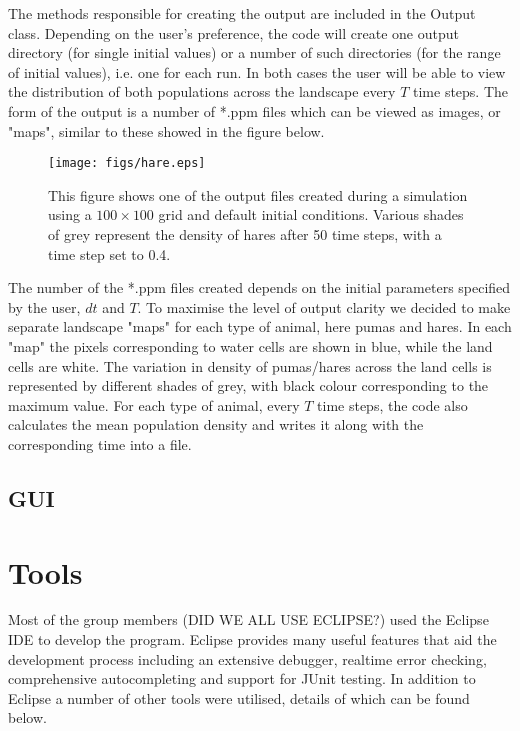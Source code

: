 \documentclass[11pt]{report}
\begin{document}
      The methods responsible for creating the output are included in the Output class. Depending on the user's preference, the code will create one output directory (for single initial values) or a number of such directories (for the range of initial values), i.e. one for each run. In both cases the user will be able to view the distribution of both populations across the landscape every $T$ time steps. The form of the output is a number of *.ppm files which can be viewed as images, or "maps", similar to these showed in the figure below.
      
      \begin{figure}[H]
      \begin{center}
      \texttt{[image: figs/hare.eps]}
      \caption{This figure shows one of the output files created during a simulation using a $100 \times 100$ grid and default initial conditions. Various shades of grey represent the density of hares after 50 time steps, with a time step set to 0.4.}
      \end{center}
      \end{figure}
      
      The number of the *.ppm files created depends on the initial parameters specified by the user, $dt$ and $T$. To maximise the level of output clarity we decided to make separate landscape "maps" for each type of animal, here pumas and hares. In each "map" the pixels corresponding to water cells are shown in blue, while the land cells are white. The variation in density of pumas/hares across the land cells is represented by different shades of grey, with black colour corresponding to the maximum value. 
      \newline{}
      For each type of animal, every $T$ time steps, the code also calculates the mean population density and writes it along with the corresponding time into a file. 
      

      
      	
      
      
      \subsection{GUI} %
   
   \section{Tools}
Most of the group members (DID WE ALL USE ECLIPSE?) used the Eclipse IDE to develop the program. Eclipse provides many useful features that aid the development process including an extensive debugger, realtime error checking, comprehensive autocompleting and support for JUnit testing. In addition to Eclipse a number of other tools were utilised, details of which can be found below.
\end{document}
